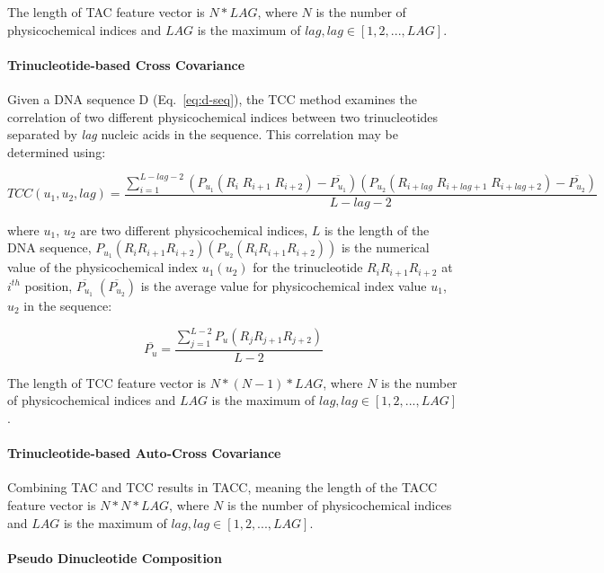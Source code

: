 The length of \gls{TAC} feature vector is $N*LAG$, where $N$ is the number of physicochemical indices and $LAG$ is the maximum of $lag, lag \in [1,2,...,LAG]$.

\paragraph{Trinucleotide-based Cross Covariance}

Given a \gls{DNA} sequence D (Eq.~\ref{eq:d-seq}), the \gls{TCC} method examines the correlation of two different physicochemical indices between two trinucleotides separated by \textit{lag} nucleic acids in the sequence. This correlation may be determined using:

\begin{equation}\label{eq:TCC}
    TCC(u_{1},u_{2},lag) = \frac{\sum_{i=1}^{L-lag-2}(P_{u_{1}}(R_{i}\;R_{i+1}\;R_{i+2}) - \overline{P_{u_{1}}})(P_{u_{2}}(R_{i+lag}\;R_{i+lag+1}\;R_{i+lag+2}) - \overline{P_{u_{2}}})}{L-lag-2}
\end{equation}

where $u_{1}$, $u_{2}$ are two different physicochemical indices, $L$ is the length of the \gls{DNA} sequence, $P_{u_{1}}(R_{i}R_{i+1}R_{i+2}) (P_{u_{2}}(R_{i}R_{i+1}R_{i+2}))$ is the numerical value of the physicochemical index $u_{1}(u_{2})$ for the trinucleotide $R_{i}R_{i+1}R_{i+2}$ at $i^{th}$ position, $\overline{P_{u_{1}}}\;(\overline{P_{u_{2}}})$ is the average value for physicochemical index value $u_{1}$, $u_{2}$ in the sequence:

\begin{equation}\label{eq:TCC-PU2}
    \overline{P_{u}} = \frac{\sum_{j=1}^{L-2}P_{u}(R_{j}R_{j+1}R_{j+2})}{L-2}
\end{equation}

The length of \gls{TCC} feature vector is $N*(N-1)*LAG$, where $N$ is the number of physicochemical indices and $LAG$ is the maximum of $lag, lag \in [1,2,...,LAG]$.


\paragraph{Trinucleotide-based Auto-Cross Covariance}
Combining \gls{TAC} and \gls{TCC} results in \gls{TACC}, meaning the length of the \gls{TACC} feature vector is $N*N*LAG$, where $N$ is the number of physicochemical indices and $LAG$ is the maximum of $lag, lag \in [1,2,...,LAG]$.

\paragraph{Pseudo Dinucleotide Composition}

